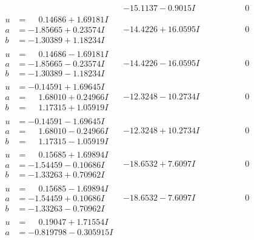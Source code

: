 \documentclass[1p]{elsarticle_modified}
\theoremstyle{definition}
\begin{document}
$$\begin{array}{c|c|c}
 & -15.1137 - 0.9015 I & \phantom{-0.000000 } 0 \\ \hline\begin{aligned}
u &= \phantom{-}0.14686 + 1.69181 I \\
a &= -1.85665 + 0.23574 I \\
b &= -1.30389 + 1.18234 I\end{aligned}
 & -14.4226 + 16.0595 I & \phantom{-0.000000 } 0 \\ \hline\begin{aligned}
u &= \phantom{-}0.14686 - 1.69181 I \\
a &= -1.85665 - 0.23574 I \\
b &= -1.30389 - 1.18234 I\end{aligned}
 & -14.4226 - 16.0595 I & \phantom{-0.000000 } 0 \\ \hline\begin{aligned}
u &= -0.14591 + 1.69645 I \\
a &= \phantom{-}1.68010 + 0.24966 I \\
b &= \phantom{-}1.17315 + 1.05919 I\end{aligned}
 & -12.3248 - 10.2734 I & \phantom{-0.000000 } 0 \\ \hline\begin{aligned}
u &= -0.14591 - 1.69645 I \\
a &= \phantom{-}1.68010 - 0.24966 I \\
b &= \phantom{-}1.17315 - 1.05919 I\end{aligned}
 & -12.3248 + 10.2734 I & \phantom{-0.000000 } 0 \\ \hline\begin{aligned}
u &= \phantom{-}0.15685 + 1.69894 I \\
a &= -1.54459 - 0.10686 I \\
b &= -1.33263 + 0.70962 I\end{aligned}
 & -18.6532 + 7.6097 I & \phantom{-0.000000 } 0 \\ \hline\begin{aligned}
u &= \phantom{-}0.15685 - 1.69894 I \\
a &= -1.54459 + 0.10686 I \\
b &= -1.33263 - 0.70962 I\end{aligned}
 & -18.6532 - 7.6097 I & \phantom{-0.000000 } 0 \\ \hline\begin{aligned}
u &= \phantom{-}0.19047 + 1.71554 I \\
a &= -0.819798 - 0.305915 I \\

\end{aligned}
\end{array}$$
\end{document}
